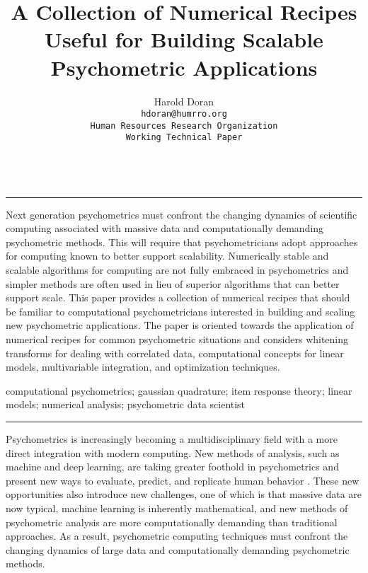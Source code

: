 \documentclass[12pt]{article}
\title{A Collection of Numerical Recipes Useful for Building Scalable Psychometric Applications}
\author{Harold Doran\\
	\texttt{hdoran@humrro.org}\\
	\texttt{Human Resources Research Organization}\\
	\texttt{Working Technical Paper}\\	\\
	}
\renewenvironment{abstract}
 {\quotation\small\noindent\rule{\linewidth}{.5pt}\par\smallskip
  {\centering\bfseries\abstractname\par}\medskip}
 {\par\noindent\rule{\linewidth}{.5pt}\endquotation}
\begin{document}
 
\maketitle

\begin{abstract}

Next generation psychometrics must confront the changing dynamics of scientific computing associated with massive data and computationally demanding psychometric methods. This will require that psychometricians adopt approaches for computing known to better support scalability. Numerically stable and scalable algorithms for computing are not fully embraced in psychometrics and simpler methods are often used in lieu of superior algorithms that can better support scale. This paper provides a collection of numerical recipes that should be familiar to computational psychometricians interested in building and scaling new psychometric applications. The paper is oriented towards the application of numerical recipes for common psychometric situations and considers whitening transforms for dealing with correlated data, computational concepts for linear models, multivariable integration, and optimization techniques.  
 
\vspace{0.2in}

 computational psychometrics; gaussian quadrature; item response theory; linear models; numerical analysis; psychometric data scientist

\end{abstract}

Psychometrics is increasingly becoming a multidisciplinary field with a more direct integration with modern computing. New methods of analysis, such as machine and deep learning, are taking greater foothold in psychometrics and present new ways to evaluate, predict, and replicate human behavior \cite{act}. These new opportunities also introduce new challenges, one of which is that massive data are now typical, machine learning is inherently mathematical, and new methods of psychometric analysis are more computationally demanding than traditional approaches. As a result, psychometric computing techniques must confront the changing dynamics of large data and computationally demanding psychometric methods. 
\end{document}
